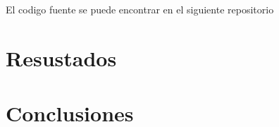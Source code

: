 \documentclass[]{report}
\begin{document}
	El codigo fuente se puede encontrar en el siguiente repositorio
	\section{Resustados}
	
	\section{Conclusiones}
\end{document}
